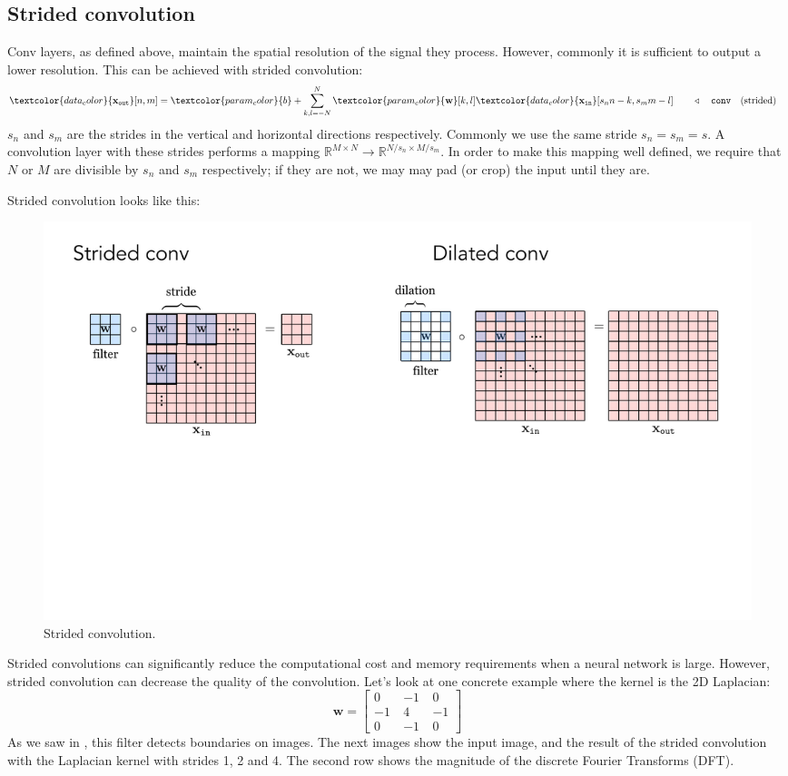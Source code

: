 \subsection{Strided convolution}

Conv layers, as defined above, maintain the spatial resolution of the signal they process. However, commonly it is sufficient to output a lower resolution. This can be achieved with strided convolution:
\begin{align}
\textcolor{data_color}{\xout}[n,m] =
\textcolor{param_color}{b} + \sum_{k,l=-N}^N \textcolor{param_color}{\mathbf{w}}[k,l] \textcolor{data_color}{\xin}[s_n n-k,s_m m-l] & \quad\quad \triangleleft \quad \texttt{conv}\quad \text{(strided)}\label{eqn:convolutional_neural_nets:convolutional_filter_strided}
\end{align}
$s_n$ and $s_m$ are the strides in the vertical and horizontal directions respectively. Commonly we use the same stride $s_n = s_m = s$. A convolution layer with these strides performs a mapping $\mathbb{R}^{M \times N} \rightarrow \mathbb{R}^{N/s_n \times M/s_m}$. In order to make this mapping well defined, we require that $N$ or $M$ are divisible by $s_n$ and $s_m$ respectively; if they are not, we may may pad (or crop) the input until they are.

Strided convolution looks like this:
\begin{figure}[h]
\centerline{
    \includegraphics[width=0.45\linewidth]{./figures/convolutional_neural_nets/strided_conv_diagram.pdf}}
    \caption{Strided convolution.}
    \label{fig:convolutional_neural_nets:strided_conv_diagram}
\end{figure}

Strided convolutions can significantly reduce the computational cost and memory requirements when a neural network is large. However, strided convolution can decrease the quality of the convolution. Let's look at one concrete example where the kernel is the 2D Laplacian:
\begin{equation}
\mathbf{w} = 
\begin{bmatrix}
  0 ~& -1 ~& 0 \\
  -1 ~& 4 ~& -1\\
  0~& -1 ~& 0
\end{bmatrix}
\end{equation}
As we saw in \chap{\ref{chapter:image_derivatives}}, this filter detects boundaries on images. The next images show the input image, and the result of the strided convolution with the Laplacian kernel with strides 1, 2 and 4. The second row shows the magnitude of the discrete Fourier Transforms (DFT).

